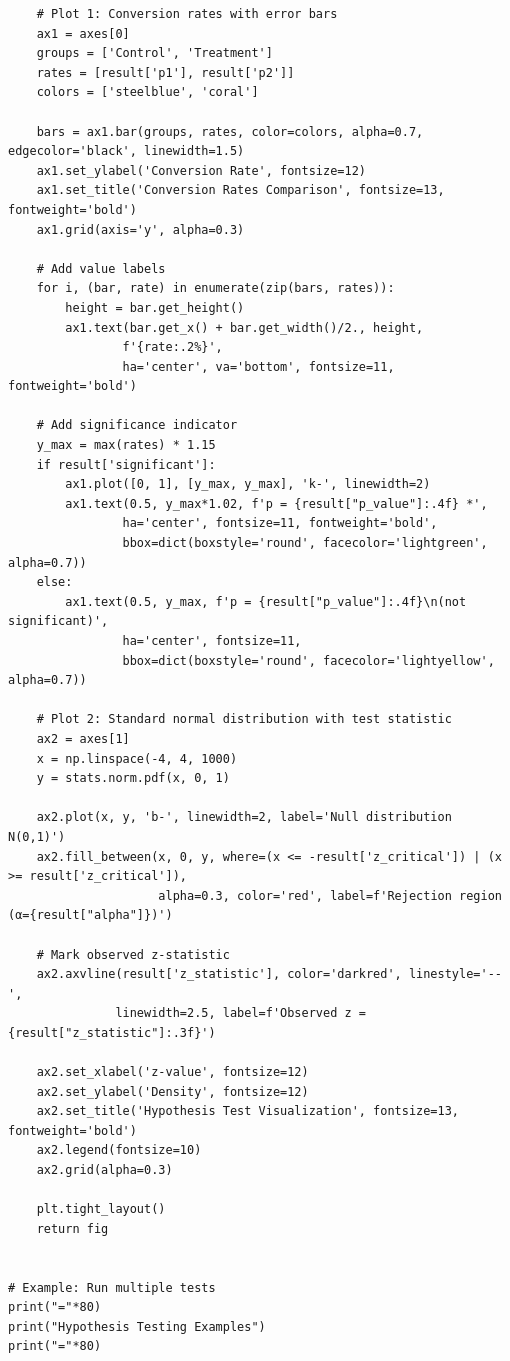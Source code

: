 \begin{lstlisting}
    # Plot 1: Conversion rates with error bars
    ax1 = axes[0]
    groups = ['Control', 'Treatment']
    rates = [result['p1'], result['p2']]
    colors = ['steelblue', 'coral']

    bars = ax1.bar(groups, rates, color=colors, alpha=0.7, edgecolor='black', linewidth=1.5)
    ax1.set_ylabel('Conversion Rate', fontsize=12)
    ax1.set_title('Conversion Rates Comparison', fontsize=13, fontweight='bold')
    ax1.grid(axis='y', alpha=0.3)

    # Add value labels
    for i, (bar, rate) in enumerate(zip(bars, rates)):
        height = bar.get_height()
        ax1.text(bar.get_x() + bar.get_width()/2., height,
                f'{rate:.2%}',
                ha='center', va='bottom', fontsize=11, fontweight='bold')

    # Add significance indicator
    y_max = max(rates) * 1.15
    if result['significant']:
        ax1.plot([0, 1], [y_max, y_max], 'k-', linewidth=2)
        ax1.text(0.5, y_max*1.02, f'p = {result["p_value"]:.4f} *',
                ha='center', fontsize=11, fontweight='bold',
                bbox=dict(boxstyle='round', facecolor='lightgreen', alpha=0.7))
    else:
        ax1.text(0.5, y_max, f'p = {result["p_value"]:.4f}\n(not significant)',
                ha='center', fontsize=11,
                bbox=dict(boxstyle='round', facecolor='lightyellow', alpha=0.7))

    # Plot 2: Standard normal distribution with test statistic
    ax2 = axes[1]
    x = np.linspace(-4, 4, 1000)
    y = stats.norm.pdf(x, 0, 1)

    ax2.plot(x, y, 'b-', linewidth=2, label='Null distribution N(0,1)')
    ax2.fill_between(x, 0, y, where=(x <= -result['z_critical']) | (x >= result['z_critical']),
                     alpha=0.3, color='red', label=f'Rejection region (α={result["alpha"]})')

    # Mark observed z-statistic
    ax2.axvline(result['z_statistic'], color='darkred', linestyle='--',
               linewidth=2.5, label=f'Observed z = {result["z_statistic"]:.3f}')

    ax2.set_xlabel('z-value', fontsize=12)
    ax2.set_ylabel('Density', fontsize=12)
    ax2.set_title('Hypothesis Test Visualization', fontsize=13, fontweight='bold')
    ax2.legend(fontsize=10)
    ax2.grid(alpha=0.3)

    plt.tight_layout()
    return fig


# Example: Run multiple tests
print("="*80)
print("Hypothesis Testing Examples")
print("="*80)


\end{lstlisting}
